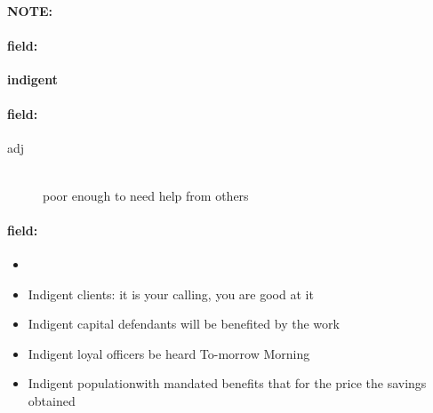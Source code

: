 \documentclass[12pt]{article}
\newenvironment{note}{\paragraph{NOTE:}}{}
\newenvironment{field}{\paragraph{field:}}{}
\begin{document}
\begin{note}
\begin{field}
\textbf{\large indigent}
\end{field}


\begin{field}
\begin{description}
\item[adj] \hfill \\ 
poor enough to need help from others

\end{description}
\end{field}

\begin{field}
\begin{itemize}
\item 
\item Indigent clients: it is your calling, you are good at it
\item Indigent capital defendants will be benefited by the work
\item Indigent loyal officers be heard To-morrow Morning
\item Indigent populationwith mandated benefits that for the price the savings obtained
\end{itemize}
\end{field}
\end{note}
\end{document}
